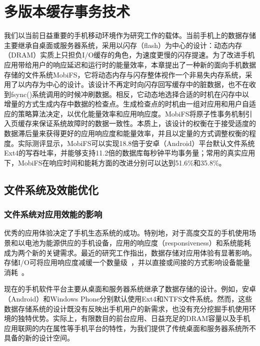 \chapter{多版本缓存事务技术}
\label{chap:vct}

我们以当前日益重要的手机移动环境作为研究工作的载体。当前手机上的数据存储主要继承自桌面或服务器系统，采用以闪存（flash）为中心的设计：动态内存（DRAM）实质上只担负I/O缓存的角色，为速度更慢的闪存提速。为了改进手机应用带给用户的响应延迟和运行时的能量效率，本章提出了一种新的面向手机数据存储的文件系统MobiFS，它将动态内存与闪存整体视作一个非易失内存系统，采用了以内存为中心的设计。该设计不再定时向闪存回写缓存中的脏数据，也不在收到fsync()系统调用的时候冲刷数据。相反，它动态地选择合适的时机在闪存中以增量的方式生成内存中数据的检查点。生成检查点的时机由一组对应用和用户自适应的策略算法决定，以优化能量效率和应用响应度。MobiFS将原子性事务机制引入页缓存来保证系统故障时的数据一致性。本质上，该设计的权衡在于接受适度的数据滞后量来获得更好的应用响应度和能量效率，并且以定量的方式调整权衡的程度。实际测评显示，MobiFS可以实现18.8倍于安卓（Android）平台默认文件系统Ext4的写吞吐率，并能够支持11.2倍的数据库每秒钟平均事务量；常用的真实应用下，MobiFS在响应时间和能耗方面的改进分别可以达到51.6\%和35.8\%。

\section{文件系统及效能优化}

\subsection{文件系统对应用效能的影响}

优秀的应用体验决定了手机生态系统的成功。特别地，对于高度交互的手机使用场景和以电池为能源供应的手机设备，应用的响应度（responsiveness）和系统能耗成为两个新的关键需求。最近的研究工作指出，数据存储对应用体验有显著影响。存储I/O可将应用响应度减缓一个数量级~\cite{Desnoyers:2013:SRN:2534861.2534867, Kim:RSS:2012,Lee:2012:SLD:2380356.2380367, Nguyen:2014:ISR:2638728.2638841}，并以直接或间接的方式影响设备能量消耗~\cite{Li:2014:EOM:2591305.2591316,Nguyen:2013:SSE:2493432.2493505,
Xu:2013:OBE:2462456.2464444}。

现在的手机软件平台主要从桌面和服务器系统继承了数据存储的设计。例如，安卓（Android）和Windows Phone分别默认使用Ext4和NTFS文件系统。然而，这些数据存储系统的设计既没有反映出手机用户的新需求，也没有充分挖掘手机使用环境的独特优势。实际上，有限数目的前台应用、日益充足的DRAM容量以及手机应用联网的内在属性等手机平台的特性，为我们提供了传统桌面和服务器系统所不具备的新的设计空间。

